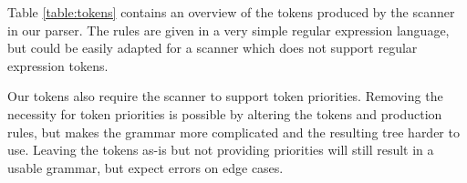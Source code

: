 \documentclass[conference]{IEEEtran}
\begin{document}
Table \ref{table:tokens} contains an overview of the tokens produced by the scanner in our parser. The rules are given in a very simple regular expression language, but could be easily adapted for a scanner which does not support regular expression tokens.

Our tokens also require the scanner to support token priorities. Removing the necessity for token priorities is possible by altering the tokens and production rules, but makes the grammar more complicated and the resulting tree harder to use. Leaving the tokens as-is but not providing priorities will still result in a usable grammar, but expect errors on edge cases.

\end{document}
